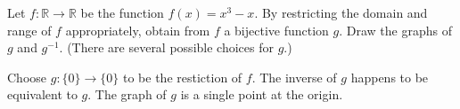 \documentclass{zupan}
\begin{document}
\begin{problem}{6}
  Let $f : \mathbb{R} \to \mathbb{R}$ be the function $f(x) = x^3 - x$. By
  restricting the domain and range of $f$ appropriately, obtain from $f$ a
  bijective function $g$. Draw the graphs of $g$ and $g^{-1}$. (There are
  several possible choices for $g$.)
\end{problem}

\begin{solution}
  Choose $g : \{0\} \to \{0\}$ to be the restiction of $f$. The inverse of $g$
  happens to be equivalent to $g$. The graph of $g$ is a single point at the
  origin.
\end{solution}
\end{document}
